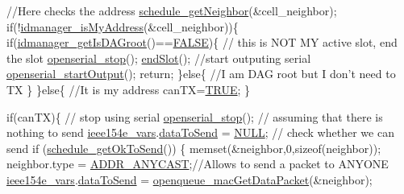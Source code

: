 \begin{DoxyCodeInclude}
          \textcolor{comment}{//Here checks the address}
          \hyperlink{group___schedule_ga6a1d0334cd9da212a38a1db05e291d3a}{schedule\_getNeighbor}(&cell\_neighbor);
          \textcolor{keywordflow}{if}(!\hyperlink{group___i_d_manager_ga4cff67772250923086a3d6476eb673c8}{idmanager\_isMyAddress}(&cell\_neighbor))\{
                \textcolor{keywordflow}{if}(\hyperlink{group___i_d_manager_gaa792e6561333f1615bbc61392e826d39}{idmanager\_getIsDAGroot}()==\hyperlink{types_8h_aa93f0eb578d23995850d61f7d61c55c1}{FALSE})\{
                    \textcolor{comment}{// this is NOT MY active slot, end the slot}
                    \hyperlink{group___open_serial_ga3459b731e462b664947a4e3260c51512}{openserial\_stop}();
                    \hyperlink{_i_e_e_e802154_e_8c_a4d32f5f6b6be4f7b407550ae26a898df}{endSlot}();
                    \textcolor{comment}{//start outputing serial}
                    \hyperlink{group___open_serial_gaf25875805325e15644a0cc1ddf2d1ad7}{openserial\_startOutput}();
                    \textcolor{keywordflow}{return};
                \}\textcolor{keywordflow}{else}\{
                    \textcolor{comment}{//I am DAG root but I don't need to TX}
                \}
          \}\textcolor{keywordflow}{else}\{
                \textcolor{comment}{//It is my address}
                canTX=\hyperlink{types_8h_aa8cecfc5c5c054d2875c03e77b7be15d}{TRUE};
          \}

         \textcolor{keywordflow}{if}(canTX)\{
             \textcolor{comment}{// stop using serial}
             \hyperlink{group___open_serial_ga3459b731e462b664947a4e3260c51512}{openserial\_stop}();
             \textcolor{comment}{// assuming that there is nothing to send}
             \hyperlink{_i_e_e_e802154_e_8c_abbfc7f36c7b2d2635f4407908445a89b}{ieee154e\_vars}.\hyperlink{structieee154e__vars__t_a88449ac7a09ec14e0053fdcf6a6ac790}{dataToSend} = \hyperlink{arm__cm4_8h_a070d2ce7b6bb7e5c05602aa8c308d0c4}{NULL};
             \textcolor{comment}{// check whether we can send}
             \textcolor{keywordflow}{if} (\hyperlink{group___schedule_gab5a0194710b51bf73b6aa363cb2fd8cb}{schedule\_getOkToSend}()) \{
                memset(&neighbor,0,\textcolor{keyword}{sizeof}(neighbor));
                neighbor.type             = \hyperlink{opendefs_8h_a52864abcf6ebd8d120995b36fe6ce06eac81661e9fd1e185f968667664896d0b9}{ADDR\_ANYCAST};\textcolor{comment}{//Allows to send a packet to ANYONE}
                \hyperlink{_i_e_e_e802154_e_8c_abbfc7f36c7b2d2635f4407908445a89b}{ieee154e\_vars}.\hyperlink{structieee154e__vars__t_a88449ac7a09ec14e0053fdcf6a6ac790}{dataToSend} = 
      \hyperlink{group___open_queue_ga654ff57cc43c12704d87dc66fcfe7fa2}{openqueue\_macGetDataPacket}(&neighbor);
\end{DoxyCodeInclude}
